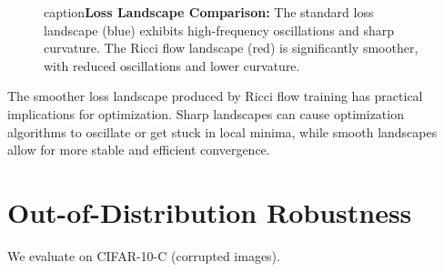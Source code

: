 \documentclass[12pt,a4paper]{article}
\begin{document}
\begin{figure}[htbp]
\centering
{}
caption{\textbf{Loss Landscape Comparison:} The standard loss landscape 
         (blue) exhibits high-frequency oscillations and sharp curvature. 
         The Ricci flow landscape (red) is significantly smoother, with 
         reduced oscillations and lower curvature.}
\label{fig:landscape}
\end{figure}

The smoother loss landscape produced by Ricci flow training has practical implications for optimization. Sharp landscapes can cause optimization algorithms to oscillate or get stuck in local minima, while smooth landscapes allow for more stable and efficient convergence.

\section{Out-of-Distribution Robustness}

We evaluate on CIFAR-10-C (corrupted images).
\end{document}
